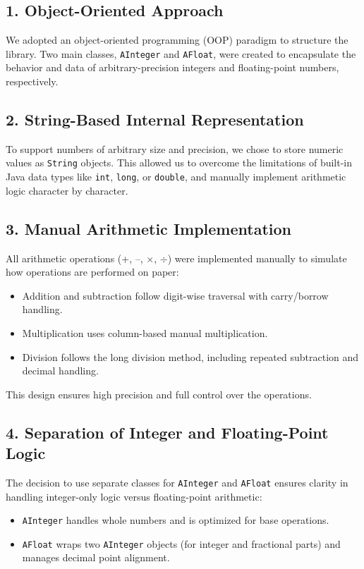 \documentclass{article}
\begin{document}
\subsection*{1. Object-Oriented Approach}
We adopted an object-oriented programming (OOP) paradigm to structure the library. Two main classes, \texttt{AInteger} and \texttt{AFloat}, were created to encapsulate the behavior and data of arbitrary-precision integers and floating-point numbers, respectively.

\subsection*{2. String-Based Internal Representation}
To support numbers of arbitrary size and precision, we chose to store numeric values as \texttt{String} objects. This allowed us to overcome the limitations of built-in Java data types like \texttt{int}, \texttt{long}, or \texttt{double}, and manually implement arithmetic logic character by character.

\subsection*{3. Manual Arithmetic Implementation}
All arithmetic operations (+, –, $\times$, $\div$) were implemented manually to simulate how operations are performed on paper:
\begin{itemize}
    \item Addition and subtraction follow digit-wise traversal with carry/borrow handling.
    \item Multiplication uses column-based manual multiplication.
    \item Division follows the long division method, including repeated subtraction and decimal handling.
\end{itemize}
This design ensures high precision and full control over the operations.

\subsection*{4. Separation of Integer and Floating-Point Logic}
The decision to use separate classes for \texttt{AInteger} and \texttt{AFloat} ensures clarity in handling integer-only logic versus floating-point arithmetic:
\begin{itemize}
    \item \texttt{AInteger} handles whole numbers and is optimized for base operations.
    \item \texttt{AFloat} wraps two \texttt{AInteger} objects (for integer and fractional parts) and manages decimal point alignment.
\end{itemize}
\end{document}
